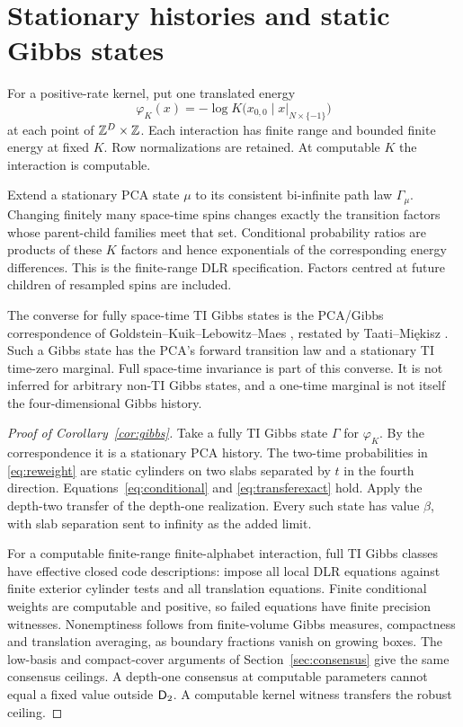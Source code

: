 \section{Stationary histories and static Gibbs states}\label{sec:gibbs}
For a positive-rate kernel, put one translated energy
\[
 \varphi_K(x)=-\log K\bigl(x_{0,0}\mid
                              x|_{N\times\{-1\}}\bigr)
\]
at each point of $\mathbb Z^D\times\mathbb Z$. Each interaction has finite
range and bounded finite energy at fixed $K$. Row normalizations
are retained. At computable $K$ the interaction is computable.

Extend a stationary PCA state $\mu$ to its consistent bi-infinite
path law $\Gamma_\mu$. Changing finitely many space-time spins
changes exactly the transition factors whose parent-child families
meet that set. Conditional probability ratios are products of
these $K$ factors and hence exponentials of the corresponding
energy differences. This is the finite-range DLR specification.
Factors centred at future children of resampled spins are included.

The converse for fully space-time TI Gibbs states is the
PCA/Gibbs correspondence of Goldstein--Kuik--Lebowitz--Maes
\cite{goldstein}, restated by Taati--Mi\k{e}kisz
\cite[Theorem~3.2]{miekisztaati}. Such a Gibbs state has the PCA's
forward transition law and a stationary TI time-zero marginal.
Full space-time invariance is part of this converse. It is not
inferred for arbitrary non-TI Gibbs states, and a one-time
marginal is not itself the four-dimensional Gibbs history.

\begin{proof}[Proof of Corollary~\ref{cor:gibbs}]
Take a fully TI Gibbs state $\Gamma$ for $\varphi_K$.
By the correspondence it is a stationary PCA history. The
two-time probabilities in \eqref{eq:reweight} are static
cylinders on two slabs separated by $t$ in the fourth direction.
Equations~\eqref{eq:conditional} and \eqref{eq:transferexact}
hold. Apply the depth-two transfer of the depth-one realization.
Every such state has value $\beta$, with slab separation sent
to infinity as the added limit.

For a computable finite-range finite-alphabet interaction, full
TI Gibbs classes have effective closed code descriptions:
impose all local DLR equations against finite exterior cylinder
tests and all translation equations. Finite conditional weights
are computable and positive, so failed equations have finite
precision witnesses. Nonemptiness follows from finite-volume
Gibbs measures, compactness and translation averaging, as boundary
fractions vanish on growing boxes. The low-basis and compact-cover
arguments of Section~\ref{sec:consensus} give the same consensus
ceilings. A depth-one consensus at computable parameters cannot
equal a fixed value outside $\mathsf D_2$. A computable kernel witness
transfers the robust ceiling.
\end{proof}


